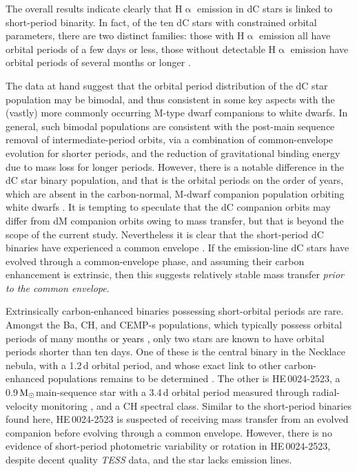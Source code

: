 \documentclass[fleqn,usenatbib,useAMS]{mnras}
\newcommand{\lw}[1]{\textcolor{black}{#1}}
\newcommand{\Msun}{\ensuremath{\rm{M}_\odot}}
\begin{document}
The overall results indicate clearly that H$\upalpha$ emission in dC stars is linked to short-period binarity.  In fact, of the ten dC stars with constrained orbital parameters, there are two distinct families: those with H$\upalpha$ emission all have orbital periods of a few days or less, those without detectable H$\upalpha$ emission have orbital periods of several months or longer \citep{Dearborn86,Harris18,Margon18,Roulston2021}.

The data at hand suggest that the orbital period distribution of the dC star population may be bimodal, and thus consistent in some key aspects with the (vastly) more commonly occurring M-type dwarf companions to white dwarfs.  In general, such bimodal populations are consistent with the post-main sequence removal of intermediate-period orbits, via a combination of common-envelope evolution for shorter periods, and the reduction of gravitational binding energy due to mass loss for longer periods.  However, there is a notable difference in the dC star binary population, and that is the orbital periods on the order of years, which are absent in the carbon-normal, M-dwarf companion population orbiting white dwarfs \citep{Farihi10,Nebot2011,Ashley2019}.  It is tempting to speculate that the dC companion orbits may differ from dM companion orbits owing to mass transfer, but that is beyond the scope of the current study.  Nevertheless it is clear that the short-period dC binaries have experienced a common envelope \citep{Izzard12,Ivanova13}.  If the emission-line dC stars have evolved through a common-envelope phase, and assuming their carbon enhancement is extrinsic, then this suggests relatively stable mass transfer {\em prior to the common envelope}.  

Extrinsically carbon-enhanced binaries possessing short-orbital periods are rare.  Amongst the Ba, CH, and CEMP-s populations, which typically possess orbital periods of many months or \lw{years \citep{Cemps,CH,Jorissen19},} only two stars are known to have orbital periods shorter than ten days.  One of these is the central binary in the Necklace nebula, with a 1.2\,d orbital period, and whose exact link to other carbon-enhanced populations remains to be determined \citep{Miszalski13}.  The other is HE\,0024-2523, a 0.9\,\Msun main-sequence star with a 3.4\,d orbital period measured through radial-velocity monitoring \citep{Luc03}, and a CH spectral class.  Similar to the short-period binaries found here, HE\,0024-2523 is suspected of receiving mass transfer from an evolved companion before evolving through a common envelope.  However, there is no evidence of short-period photometric variability or rotation in HE\,0024-2523, despite decent quality {\em TESS} data, and the star lacks emission lines.
\end{document}
